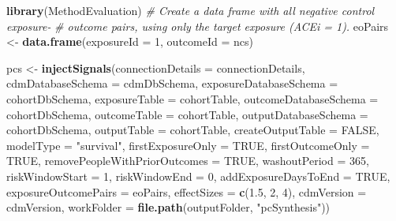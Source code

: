\documentclass[11pt]{book}
\newenvironment{Shaded}{\begin{snugshade}}{\end{snugshade}}
\newcommand{\CommentTok}[1]{\textcolor[rgb]{0.56,0.35,0.01}{\textit{#1}}}
\newcommand{\DataTypeTok}[1]{\textcolor[rgb]{0.13,0.29,0.53}{#1}}
\newcommand{\DecValTok}[1]{\textcolor[rgb]{0.00,0.00,0.81}{#1}}
\newcommand{\FloatTok}[1]{\textcolor[rgb]{0.00,0.00,0.81}{#1}}
\newcommand{\KeywordTok}[1]{\textcolor[rgb]{0.13,0.29,0.53}{\textbf{#1}}}
\newcommand{\NormalTok}[1]{#1}
\newcommand{\OtherTok}[1]{\textcolor[rgb]{0.56,0.35,0.01}{#1}}
\newcommand{\StringTok}[1]{\textcolor[rgb]{0.31,0.60,0.02}{#1}}
\theoremstyle{definition}
\theoremstyle{definition}
\theoremstyle{definition}
\theoremstyle{remark}
\begin{document}
\begin{Shaded}
\begin{Highlighting}[]
\KeywordTok{library}\NormalTok{(MethodEvaluation)}
\CommentTok{# Create a data frame with all negative control exposure-}
\CommentTok{# outcome pairs, using only the target exposure (ACEi = 1).}
\NormalTok{eoPairs <-}\StringTok{ }\KeywordTok{data.frame}\NormalTok{(}\DataTypeTok{exposureId =} \DecValTok{1}\NormalTok{,}
                      \DataTypeTok{outcomeId =}\NormalTok{ ncs)}

\NormalTok{pcs <-}\StringTok{ }\KeywordTok{injectSignals}\NormalTok{(}\DataTypeTok{connectionDetails =}\NormalTok{ connectionDetails,}
                     \DataTypeTok{cdmDatabaseSchema =}\NormalTok{ cdmDbSchema,}
                     \DataTypeTok{exposureDatabaseSchema =}\NormalTok{ cohortDbSchema,}
                     \DataTypeTok{exposureTable =}\NormalTok{ cohortTable,}
                     \DataTypeTok{outcomeDatabaseSchema =}\NormalTok{ cohortDbSchema,}
                     \DataTypeTok{outcomeTable =}\NormalTok{ cohortTable,}
                     \DataTypeTok{outputDatabaseSchema =}\NormalTok{ cohortDbSchema,}
                     \DataTypeTok{outputTable =}\NormalTok{ cohortTable,}
                     \DataTypeTok{createOutputTable =} \OtherTok{FALSE}\NormalTok{,}
                     \DataTypeTok{modelType =} \StringTok{"survival"}\NormalTok{,}
                     \DataTypeTok{firstExposureOnly =} \OtherTok{TRUE}\NormalTok{,}
                     \DataTypeTok{firstOutcomeOnly =} \OtherTok{TRUE}\NormalTok{,}
                     \DataTypeTok{removePeopleWithPriorOutcomes =} \OtherTok{TRUE}\NormalTok{,}
                     \DataTypeTok{washoutPeriod =} \DecValTok{365}\NormalTok{,}
                     \DataTypeTok{riskWindowStart =} \DecValTok{1}\NormalTok{,}
                     \DataTypeTok{riskWindowEnd =} \DecValTok{0}\NormalTok{,}
                     \DataTypeTok{addExposureDaysToEnd =} \OtherTok{TRUE}\NormalTok{,}
                     \DataTypeTok{exposureOutcomePairs =}\NormalTok{ eoPairs,}
                     \DataTypeTok{effectSizes =} \KeywordTok{c}\NormalTok{(}\FloatTok{1.5}\NormalTok{, }\DecValTok{2}\NormalTok{, }\DecValTok{4}\NormalTok{),}
                     \DataTypeTok{cdmVersion =}\NormalTok{ cdmVersion,}
                     \DataTypeTok{workFolder =} \KeywordTok{file.path}\NormalTok{(outputFolder,}
                                            \StringTok{"pcSynthesis"}\NormalTok{))}
\end{Highlighting}
\end{Shaded}
\end{document}
